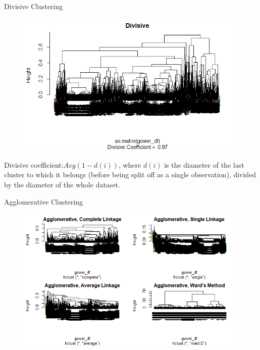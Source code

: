 \documentclass[11pt]{beamer}
\begin{document}
\begin{frame}{Divisive Clustering}
\begin{figure}
    \centering
    \includegraphics[width=0.8\linewidth]{images/decisive.png}
    \label{fig:my_label}
\end{figure}
Divisive coefficient:$Avg(1-d(i))$, where $d(i)$ is the diameter of the last cluster to which it belongs (before being split off as a single observation), divided by the diameter of the whole dataset.

\end{frame}

\begin{frame}{Agglomerative Clustering}
\begin{figure}
    \centering
    \includegraphics[width=1\linewidth]{images/agglo_comb.png}
    \label{fig:my_label}
\end{figure}
    
\end{frame}
\end{document}
